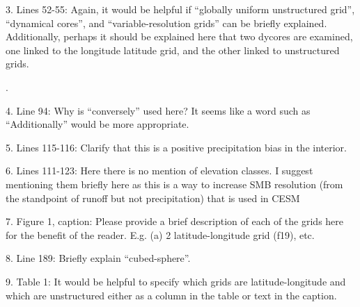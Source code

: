 \documentclass[12pt,oneside,a4paper]{article}%
\begin{document}
{\color{blue}{See above.}} \newline

3. Lines 52-55: Again, it would be helpful if “globally uniform unstructured grid”, “dynamical cores”, and “variable-resolution grids” can be briefly explained. Additionally, perhaps it should be explained here that two dycores are examined, one linked to the longitude latitude grid, and the other linked to unstructured grids.  \newline

{\color{blue}{Added clarification for the meaning of quasi-uniform and variable-resolution. Decided against getting into the specifics of which dycore uses which grid, as this becomes apparent later on in the introduction}}. \newline

4. Line 94: Why is “conversely” used here? It seems like a word such as “Additionally” would be more appropriate.  \newline

{\color{blue}{Sentence has been reworded.}} \newline

5. Lines 115-116: Clarify that this is a positive precipitation bias in the interior.  \newline

{\color{blue}{Done.}} \newline

6. Lines 111-123: Here there is no mention of elevation classes. I suggest mentioning them briefly here as this is a way to increase SMB resolution (from the standpoint of runoff but not precipitation) that is used in CESM  \newline

{\color{blue}{We agree that the idea of ECs should be introduced here, and have added a sentence.}} \newline

7. Figure 1, caption: Please provide a brief description of each of the grids here for the benefit of the reader. E.g. (a) 2 latitude-longitude grid (f19), etc.  \newline

{\color{blue}{Done.}} \newline

8. Line 189: Briefly explain “cubed-sphere”.  \newline

{\color{blue}{Done.}} \newline

9. Table 1: It would be helpful to specify which grids are latitude-longitude and which are unstructured either as a column in the table or text in the caption.  \newline
\end{document}
